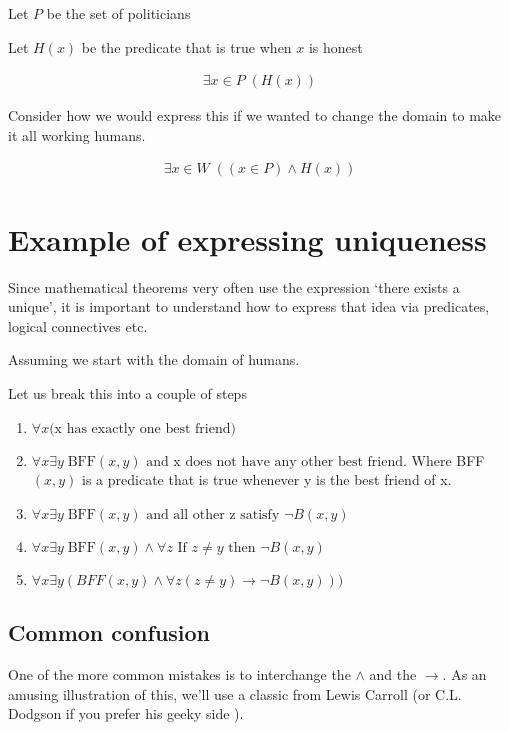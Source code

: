\documentclass[12pt]{article}
\begin{document}
Let $P$ be the set of politicians

Let $H(x)$ be the predicate that is true when $x$ is honest

\begin{align*}
\exists x \in P \; (H(x))
\end{align*}

Consider how we would express this if we wanted to change the domain to make it all working humans. 

\begin{align*}
\exists x \in W \; ((x \in P) \wedge H(x))
\end{align*}

\section*{Example of expressing uniqueness}

Since mathematical theorems very often use the expression `there exists a unique', it is important to understand how to express that idea via predicates, logical connectives etc.

Assuming we start with the domain of humans. 


Let us break this into a couple of steps

\begin{enumerate}
\item $\forall x \text{(x has exactly one best friend)}$
\item $\forall x \exists y \; \text{BFF}(x,y) \text{ and x does not have any other best friend}$. Where BFF$(x,y)$ is a predicate that is true whenever y is the best friend of x. 
\item $\forall x \exists y \; \text{BFF} (x,y) \text{ and all other z satisfy } \neg B(x,y)$
\item $\forall x \exists y \; \text{BFF} (x,y) \wedge \forall z \text{ If } z \neq y \text{ then } \neg B(x,y)$
\item $\forall x \exists y (BFF (x,y) \wedge \forall z (z \neq y) \rightarrow \neg B(x,y)))$
\end{enumerate}


\subsection*{Common confusion}

One of the more common mistakes is to interchange the $\wedge$ and the $\rightarrow$. As an amusing illustration of this, we'll use a classic from Lewis Carroll (or C.L. Dodgson if you prefer his geeky side ).
\end{document}
